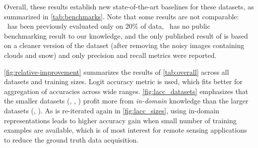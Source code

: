  

Overall, these results establish new state-of-the-art baselines for these datasets, as summarized in \cref{tab:benchmarks}. Note that some results are not comparable: \res\ has been previously evaluated only on 20\% of data, \sos\ has no public benchmarking result to our knowledge, and the only published result of \ben{} is based on a cleaner version of the dataset (after removing the noisy images containing clouds and snow) and only precision and recall metrics were reported.








\cref{fig:relative-improvement} summarizes the results of \cref{tab:overall} across all datasets and training sizes. Logit accuracy metric is used, which fits better for aggregation of accuracies across wide ranges. \cref{fig:lacc_datasets} emphasizes that the smaller datasets (\eur, \res, \ucm) profit more from \emph{in-domain} knowledge than the larger datasets (\ben, \sos). As is re-iterated again in \cref{fig:lacc_sizes}, using in-domain representations leads to higher accuracy gain when small number of training examples are available, which is of most interest for remote sensing applications to reduce the ground truth data acquisition. 


